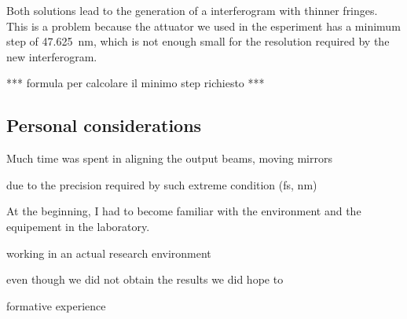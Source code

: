 \documentclass[12pt,a4paper,twoside]{article}
\begin{document}
Both solutions lead to the generation of a interferogram with thinner fringes.
This is a problem because the attuator we used in the esperiment has a minimum step of \SI{47.625}{\nm}, which is not enough small for the resolution required by the new interferogram.

*** formula per calcolare il minimo step richiesto ***

\subsection{Personal considerations}
Much time was spent in aligning the output beams, moving mirrors

due to the precision required by such extreme condition (\si{\fs}, \si{\nm})

At the beginning, I had to become familiar with the environment and the equipement in the
laboratory.

working in an actual research environment

even though we did not obtain the results we did hope to

formative experience

\clearpage

\end{document}
